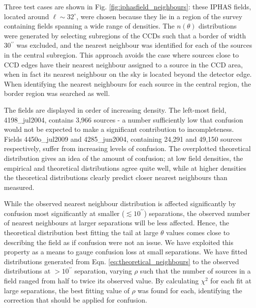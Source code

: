 \documentclass[a4paper,useAMS,usenatbib]{mn2e}
\begin{document}
Three test cases are shown in Fig. \ref{fig:iphasfield_neighbours}: these
IPHAS fields, located around $\ell\sim32^{\circ}$, were chosen because they lie in a
region of the survey containing fields spanning a wide range of densities. The
$n(\theta)$ distributions were generated by selecting subregions of the CCDs
such that a border of width 30$^{\prime\prime}$ was excluded, and the nearest
neighbour was identified for each of the sources in the central subregion. This
approach avoids the case where sources close to CCD edges have
their nearest neighbour assigned to a source in the CCD area, when in fact its
nearest neighbour on the sky is located beyond the detector edge. When identifying 
the nearest neighbours for each source in the central region, the 
border region was searched as well.

The fields are displayed in order of increasing density. The left-most field,
4198\_jul2004, contains 3,966 sources - a number sufficiently low that confusion would 
not be expected to make a significant contribution to incompleteness. Fields 
4450o\_jul2009 and 4285\_jun2004, containing 24,291 and 49,150 sources respectively, 
suffer from increasing levels of confusion. The overplotted theoretical distribution 
gives an idea of the amount of confusion; at low field densities, the empirical and 
theoretical distributions agree quite well, while at higher densities the theoretical 
distributions clearly predict closer nearest neighbours than measured.

While the observed nearest neighbour distribution is affected significantly by
confusion most significantly at smaller ($\lesssim10^{\prime\prime}$) separations, the 
observed number of nearest neighbours at larger separations will be less affected. 
Hence, the theoretical distribution best fitting the tail at large $\theta$ values comes 
close to describing the field as if confusion were not an issue.  We have exploited
this property as a means to gauge confusion loss at small separations.  We have fitted
distributions generated from Eqn. \ref{eq:theoretical_neighbours} to the observed 
distributions at $>10^{\prime\prime}$ separation, varying $\rho$ such that the number of 
sources in a field ranged from half to twice its observed value. By calculating $\chi^2$ 
for each fit at large separations, the best fitting value of $\rho$ was found for each, 
identifying the correction that should be applied for confusion.
\end{document}
